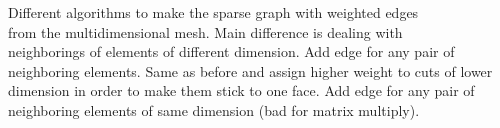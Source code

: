 \begin{SelectionType}
	{}
	{{{Different algorithms to make the sparse graph with weighted edges}\\{
from the multidimensional mesh. Main difference is dealing with }\\{
neighborings of elements of different dimension.}}}
		\KeyItem
			{}
			{{{Add edge for any pair of neighboring elements.}}}
		\KeyItem
			{}
			{{{Same as before and assign higher weight to cuts of lower dimension in order to make them stick to one face.}}}
		\KeyItem
			{}
			{{{Add edge for any pair of neighboring elements of same dimension (bad for matrix multiply).}}}
\end{SelectionType}
